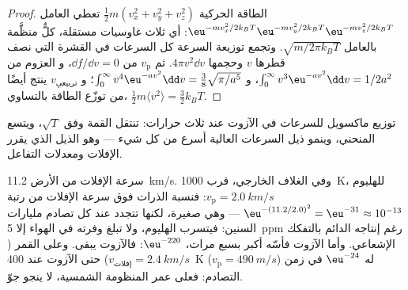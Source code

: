 \begin{proof}
الطاقة الحركية $\tfrac12m(v_x^2 + v_y^2 + v_z^2)$ تعطي العامل
$\eu^{-mv_x^2/2k_BT}\eu^{-mv_y^2/2k_BT}\eu^{-mv_z^2/2k_BT}$: أي ثلاث غاوسيات
مستقلة، كلٌّ منظَّمة بالعامل $\sqrt{m/2\pi k_BT}$. وتجمع توزيعة
السرعة كل السرعات في القشرة التي نصف قطرها $v$ وحجمها
$4\pi v^2\dd v$. ثم $v_{\text{p}}$ من $\dd f/\dd v = 0$، و
العزوم من $\int_0^\infty v^3\eu^{-av^2}\dd v = 1/2a^2$، و $\int_0^\infty
v^4\eu^{-av^2}\dd v = \tfrac38\sqrt{\pi/a^5}$؛ و $v_{\text{تربيعي}}$ ينتج أيضًا
من توزّع الطاقة بالتساوي، $\tfrac12m\langle v^2\rangle = \tfrac32k_BT$.
\end{proof}

\begin{omfigure}

{\small توزيع ماكسويل للسرعات في الآزوت عند ثلاث
حرارات: تنتقل القمة وفق $\sqrt T$، ويتسع المنحني، وينمو
ذيل السرعات العالية أسرع من كل شيء --- وهو الذيل الذي يقرر الإفلات
ومعدلات التفاعل.}
\end{omfigure}

\begin{example}\label{ex:b2:boltzmann-factor:escape}
سرعة الإفلات من الأرض \qty{11.2}{km/s}. وفي الغلاف الخارجي، قرب
\qty{1000}{K}، للهليوم $v_{\text{p}} = \qty{2.0}{km/s}$: فنسبة
الذرات فوق سرعة الإفلات من رتبة $\eu^{-(11.2/2.0)^2} = \eu^{-31}
\approx 10^{-13}$ --- وهي صغيرة، لكنها تتجدد عند كل تصادم مليارات
السنين: فيتسرب الهليوم، ولا تبلغ وفرته في الهواء إلا
\qty{5}{ppm} رغم إنتاجه الدائم بالتفكك الإشعاعي. وأما
الآزوت فأسّه أكبر بسبع مرات، $\eu^{-220}$: فالآزوت يبقى.
وعلى القمر ($v_{\text{إفلات}} = \qty{2.4}{km/s}$) حتى الآزوت عند
\qty{400}{K} ($v_{\text{p}} = \qty{490}{m/s}$) له $\eu^{-24}$ في زمن التصادم:
فعلى عمر المنظومة الشمسية، لا ينجو جوّ.
\end{example}

